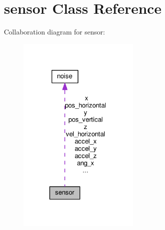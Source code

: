 \section{sensor Class Reference}
\label{classsensor}


Collaboration diagram for sensor\+:\nopagebreak
\begin{figure}[H]
\begin{center}
\leavevmode
\includegraphics[width=167pt]{classsensor__coll__graph}
\end{center}
\end{figure}
